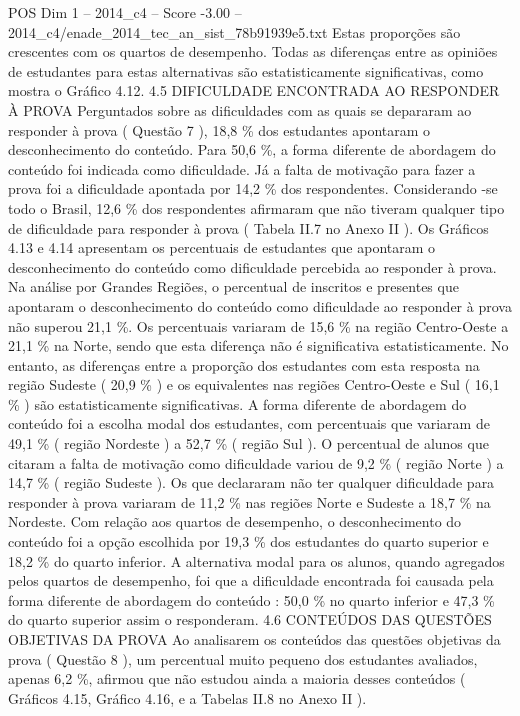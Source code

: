 \begin{textsample}{POS Dim 1 – 2014\_c4 – Score -3.00 – 2014\_c4/enade\_2014\_tec\_an\_sist\_78b91939e5.txt}
Estas proporções são crescentes com os quartos de desempenho.
Todas as diferenças entre as opiniões de estudantes para estas alternativas são estatisticamente significativas, como mostra o Gráfico 4.12. 4.5 DIFICULDADE ENCONTRADA AO RESPONDER À PROVA Perguntados sobre as dificuldades com as quais se depararam ao responder à prova ( Questão 7 ), 18,8 \% dos estudantes apontaram o desconhecimento do conteúdo.
Para 50,6 \%, a forma diferente de abordagem do conteúdo foi indicada como dificuldade.
Já a falta de motivação para fazer a prova foi a dificuldade apontada por 14,2 \% dos respondentes.
Considerando -se todo o Brasil, 12,6 \% dos respondentes afirmaram que não tiveram qualquer tipo de dificuldade para responder à prova ( Tabela II.7 no Anexo II ).
Os Gráficos 4.13 e 4.14 apresentam os percentuais de estudantes que apontaram o desconhecimento do conteúdo como dificuldade percebida ao responder à prova.
Na análise por Grandes Regiões, o percentual de inscritos e presentes que apontaram o desconhecimento do conteúdo como dificuldade ao responder à prova não superou 21,1 \%.
Os percentuais variaram de 15,6 \% na região Centro-Oeste a 21,1 \% na Norte, sendo que esta diferença não é significativa estatisticamente.
No entanto, as diferenças entre a proporção dos estudantes com esta resposta na região Sudeste ( 20,9 \% ) e os equivalentes nas regiões Centro-Oeste e Sul ( 16,1 \% ) são estatisticamente significativas.
A forma diferente de abordagem do conteúdo foi a escolha modal dos estudantes, com percentuais que variaram de 49,1 \% ( região Nordeste ) a 52,7 \% ( região Sul ).
O percentual de alunos que citaram a falta de motivação como dificuldade variou de 9,2 \% ( região Norte ) a 14,7 \% ( região Sudeste ).
Os que declararam não ter qualquer dificuldade para responder à prova variaram de 11,2 \% nas regiões Norte e Sudeste a 18,7 \% na Nordeste.
Com relação aos quartos de desempenho, o desconhecimento do conteúdo foi a opção escolhida por 19,3 \% dos estudantes do quarto superior e 18,2 \% do quarto inferior.
A alternativa modal para os alunos, quando agregados pelos quartos de desempenho, foi que a dificuldade encontrada foi causada pela forma diferente de abordagem do conteúdo : 50,0 \% no quarto inferior e 47,3 \% do quarto superior assim o responderam. 4.6 CONTEÚDOS DAS QUESTÕES OBJETIVAS DA PROVA Ao analisarem os conteúdos das questões objetivas da prova ( Questão 8 ), um percentual muito pequeno dos estudantes avaliados, apenas 6,2 \%, afirmou que não estudou ainda a maioria desses conteúdos ( Gráficos 4.15, Gráfico 4.16, e a Tabelas II.8 no Anexo II ).

\end{textsample}
